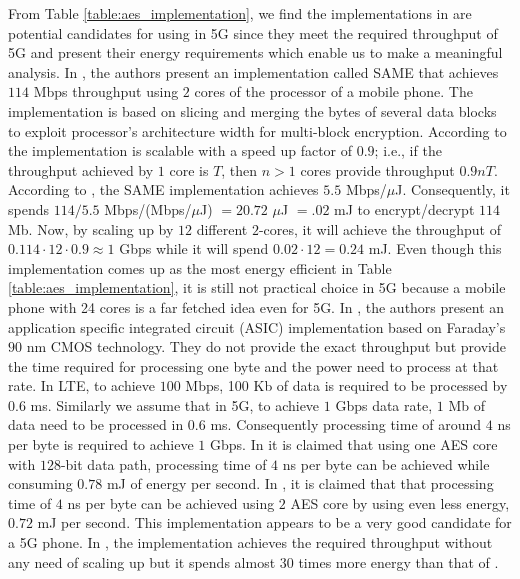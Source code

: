 \documentclass[12pt]{llncs}
\begin{document}
From Table \ref{table:aes_implementation}, we find the implementations in \cite{Ruhr_2009, Ruhr_2011, Pune_2012} are potential candidates for using in 5G since they meet the required throughput of 5G and present their energy requirements which enable us to make a meaningful analysis. In \cite{Ruhr_2011}, the authors present an implementation called SAME that achieves $114$ Mbps throughput using $2$ cores of the processor of a mobile phone. The implementation is based on slicing and merging the bytes of several data blocks to exploit processor's architecture width for multi-block encryption. According to \cite[Figure 8]{Ruhr_2011} the implementation is scalable with a speed up factor of $0.9$; i.e., if the throughput achieved by $1$ core is $T$, then $n > 1$ cores provide throughput $0.9nT$. According to \cite[Figure 9]{Ruhr_2011}, the SAME implementation achieves $5.5$ Mbps/$\mu$J. Consequently, it spends $114/5.5$ Mbps/(Mbps/$\mu$J) $=20.72$ $\mu$J $=.02$ mJ to encrypt/decrypt $114$ Mb. Now, by scaling up by $12$ different $2$-cores, it will achieve the throughput of $0.114 \cdot 12 \cdot 0.9 \approx 1$ Gbps while it will spend $0.02\cdot12=0.24$ mJ. Even though this implementation comes up as the most energy efficient in Table \ref{table:aes_implementation}, it is still not practical choice in 5G because a mobile phone with 24 cores is a far fetched idea even for 5G. In \cite{Ruhr_2009}, the authors present an application specific integrated circuit (ASIC) implementation based on Faraday's $90$ nm CMOS technology. They do not provide the exact throughput but provide the time required for processing one byte and the power need to process at that rate. In LTE, to achieve $100$ Mbps, 100 Kb of data is required to be processed by $0.6$ ms. Similarly we assume that in 5G, to achieve $1$ Gbps data rate, $1$ Mb of data need to be processed in $0.6$ ms. Consequently processing time of around $4$ ns per byte is required to achieve $1$ Gbps. In \cite[Figure 8]{Ruhr_2009} it is claimed that using one AES core with $128$-bit data path, processing time of $4$ ns per byte can be achieved while consuming $0.78$ mJ of energy per second. In \cite[Figure 10]{Ruhr_2009}, it is claimed that that processing time of $4$ ns per byte can be achieved using $2$ AES core by using even less energy, $0.72$ mJ per second. This implementation appears to be a very good candidate for a 5G phone.  In \cite{Pune_2012}, the implementation achieves the required throughput without any need of scaling up but it spends almost $30$ times more energy than that of \cite{Ruhr_2009}.
\end{document}
